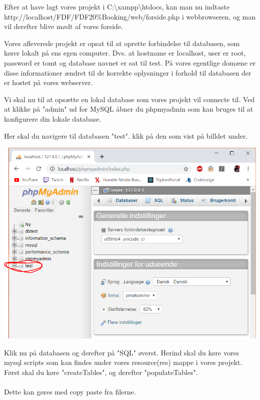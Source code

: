 \documentclass[12pt,a4paper]{report} %
\begin{document}
    \noindent Efter at have lagt vores projekt i C:\textbackslash xampp\textbackslash htdocs, kan man nu indtaste
    \newline
    \newline
    http://localhost/FDF/FDF20\%Booking/web/forside.php
    \newline
    \newline
    i webbrowseren, og man vil derefter blive mødt af vores forside. 
    
    \noindent Vores afleverede projekt er opsat til at oprette forbindelse til databasen, som kører lokalt på ens egen computer. Dvs. at hostname er localhost, user er root, password er tomt og database navnet er sat til test. På vores egentlige domæne er disse informationer ændret til de korrekte oplysninger i forhold til databasen der er hostet på vores webserver. 
    
    \noindent Vi skal nu til at opsætte en lokal database som vores projekt vil connecte til. Ved at klikke på "admin" ud for MySQL åbner du phpmyadmin som kan bruges til at konfigurere din lokale database.
    
    \noindent Her skal du navigere til databasen "test". klik på den som vist på billdet under.
    
    \hspace*{-1.5cm}\includegraphics[scale=0.85]{Billeder/installTurtorialPictures/findtestdbrigtig.PNG}
    
    
    \noindent Klik nu på databasen og derefter på "SQL" øverst. Herind skal du køre vores mysql scripts som kan findes under vores resource(res) mappe i vores projekt. Først skal du køre "createTables", og derefter "populateTables".\\\\ Dette kan gøres med copy paste fra filerne.
    
\end{document}
